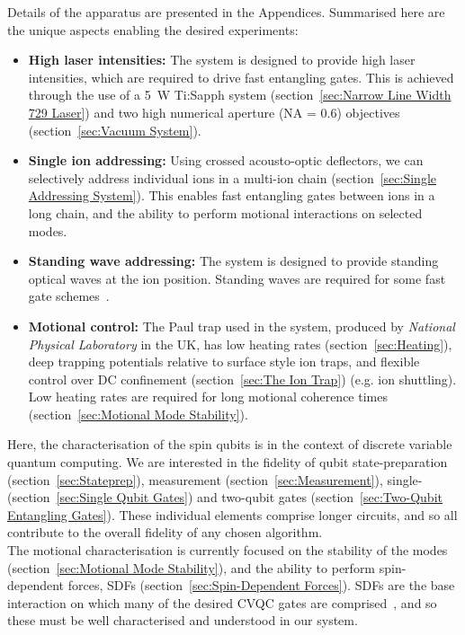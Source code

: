     Details of the apparatus are presented in the Appendices. Summarised here are the unique aspects enabling the desired experiments:
    \begin{itemize}
    \item \textbf{High laser intensities:} The system is designed to provide
        high laser intensities, which are required to drive fast entangling
        gates. This is achieved through the use of a 5~W Ti:Sapph system (section~\ref{sec:Narrow Line Width 729 Laser}) and
        two high numerical aperture (NA = 0.6) objectives (section~\ref{sec:Vacuum System}).
    \item \textbf{Single ion addressing:} Using crossed acousto-optic
        deflectors, we can selectively address individual ions in a multi-ion chain (section~\ref{sec:Single Addressing System}).
        This enables fast entangling gates between ions in a long
        chain, and the ability to perform motional interactions on selected modes.
    \item \textbf{Standing wave addressing:} The system is designed to provide
        standing optical waves at the ion position. Standing waves are required for
        some fast gate schemes~\cite{saner2023breaking}. 
    \item \textbf{Motional control:} The Paul trap used in the system, produced
        by \emph{National Physical Laboratory} in the UK, has low heating rates (section~\ref{sec:Heating}),
        deep trapping potentials relative to surface style ion traps, and flexible
        control over DC confinement (section~\ref{sec:The Ion Trap}) (e.g. ion shuttling). Low heating rates are required for long motional
        coherence times (section~\ref{sec:Motional Mode Stability}).
    \end{itemize}

    Here, the characterisation of the spin qubits is in the context of discrete
    variable quantum computing. We are interested in the fidelity of qubit
    state-preparation (section~\ref{sec:Stateprep}), measurement (section~\ref{sec:Measurement}), single- (section~\ref{sec:Single Qubit Gates}) and two-qubit gates (section~\ref{sec:Two-Qubit Entangling Gates}). These
    individual elements comprise longer circuits, and so all contribute to the
    overall fidelity of any chosen algorithm.\\
    The motional characterisation is currently focused on the stability of the
    modes (section~\ref{sec:Motional Mode Stability}), and the ability to perform spin-dependent forces, SDFs (section~\ref{sec:Spin-Dependent Forces}). SDFs are the
    base interaction on which many of the desired CVQC gates are
    comprised~\cite{sutherland2021universal}, and so these must be well
    characterised and understood in our system.\\

